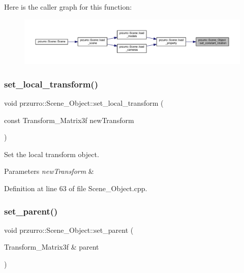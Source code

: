 Here is the caller graph for this function\+:
\nopagebreak
\begin{figure}[H]
\begin{center}
\leavevmode
\includegraphics[width=350pt]{d9/d84/classprzurro_1_1_scene___object_acbc820f987203bc0d635b4e1d0d3b3ac_icgraph}
\end{center}
\end{figure}
\mbox{\label{classprzurro_1_1_scene___object_a1ac09f9b83e81c2baf121960b7581914}} 
\subsubsection{\texorpdfstring{set\_local\_transform()}{set\_local\_transform()}}
{\footnotesize\ttfamily void przurro\+::\+Scene\+\_\+\+Object\+::set\+\_\+local\+\_\+transform (\begin{DoxyParamCaption}\item[{const Transform\+\_\+\+Matrix3f}]{new\+Transform }\end{DoxyParamCaption})}



Set the local transform object. 


\begin{DoxyParams}{Parameters}
{\em new\+Transform} & \\
\hline
\end{DoxyParams}


Definition at line 63 of file Scene\+\_\+\+Object.\+cpp.

\mbox{\label{classprzurro_1_1_scene___object_aad9cc81e105d3321828287d736b01525}} 
\subsubsection{\texorpdfstring{set\_parent()}{set\_parent()}}
{\footnotesize\ttfamily void przurro\+::\+Scene\+\_\+\+Object\+::set\+\_\+parent (\begin{DoxyParamCaption}\item[{Transform\+\_\+\+Matrix3f \&}]{parent }\end{DoxyParamCaption})}



